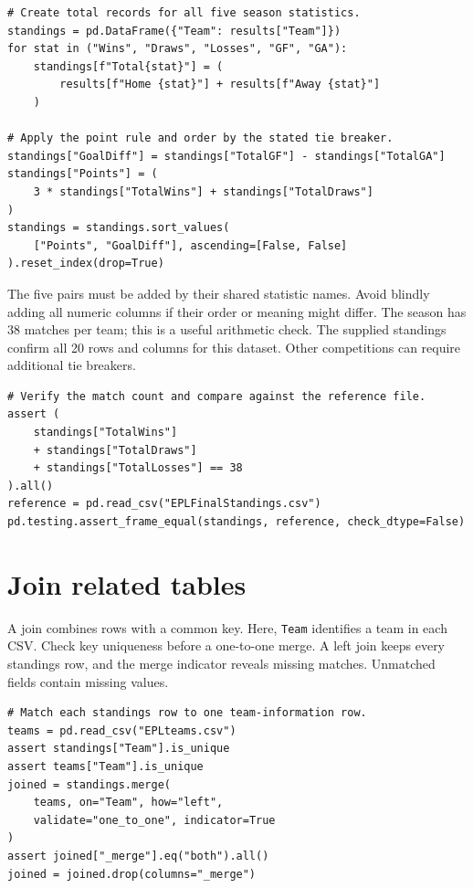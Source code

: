 \documentclass[11pt,letterpaper]{article}
\begin{document}
\begin{lstlisting}
# Create total records for all five season statistics.
standings = pd.DataFrame({"Team": results["Team"]})
for stat in ("Wins", "Draws", "Losses", "GF", "GA"):
    standings[f"Total{stat}"] = (
        results[f"Home {stat}"] + results[f"Away {stat}"]
    )

# Apply the point rule and order by the stated tie breaker.
standings["GoalDiff"] = standings["TotalGF"] - standings["TotalGA"]
standings["Points"] = (
    3 * standings["TotalWins"] + standings["TotalDraws"]
)
standings = standings.sort_values(
    ["Points", "GoalDiff"], ascending=[False, False]
).reset_index(drop=True)
\end{lstlisting}

The five pairs must be added by their shared statistic names. Avoid blindly adding all numeric columns if their order or meaning might differ. The season has 38 matches per team; this is a useful arithmetic check. The supplied standings confirm all 20 rows and columns for this dataset. Other competitions can require additional tie breakers.

\begin{lstlisting}
# Verify the match count and compare against the reference file.
assert (
    standings["TotalWins"]
    + standings["TotalDraws"]
    + standings["TotalLosses"] == 38
).all()
reference = pd.read_csv("EPLFinalStandings.csv")
pd.testing.assert_frame_equal(standings, reference, check_dtype=False)
\end{lstlisting}

\section{Join related tables}
A join combines rows with a common key. Here, \texttt{Team} identifies a team in each CSV. Check key uniqueness before a one-to-one merge. A left join keeps every standings row, and the merge indicator reveals missing matches. Unmatched fields contain missing values.

\begin{lstlisting}
# Match each standings row to one team-information row.
teams = pd.read_csv("EPLteams.csv")
assert standings["Team"].is_unique
assert teams["Team"].is_unique
joined = standings.merge(
    teams, on="Team", how="left",
    validate="one_to_one", indicator=True
)
assert joined["_merge"].eq("both").all()
joined = joined.drop(columns="_merge")
\end{lstlisting}
\end{document}
